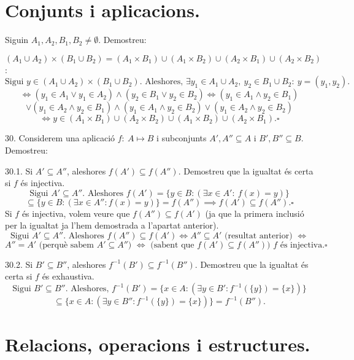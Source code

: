 \documentclass[11pt]{article}
\begin{document}
\section{Conjunts i aplicacions.}
\begin{legal}[start=21]
	\item Siguin $A_1,A_2,B_1,B_2\neq\emptyset$. Demostreu:
	\begin{legal}[start=3]
		\item $(A_1\cup A_2)\times (B_1\cup B_2)=(A_1\times B_1)\cup (A_1\times B_2)\cup (A_2\times B_1)\cup (A_2\times B_2)$:
		$$\textrm{Sigui }y\in (A_1\cup A_2)\times (B_1\cup B_2).\textrm{ Aleshores, }\exists y_1\in A_1\cup A_2, \ y_2\in B_1\cup B_2: \ y=(y_1,y_2).$$
		$$\iff (y_1\in A_1 \vee y_1\in A_2)\wedge (y_2\in B_1 \vee y_2\in B_2)\iff (y_1\in A_1\wedge y_2\in B_1)$$
		$$\vee (y_1\in A_2 \wedge y_2\in B_1)\wedge (y_1\in A_1\wedge y_2\in B_2)\vee (y_1\in A_2\wedge y_2\in B_2)$$
		$$\iff y\in (A_1\times B_1)\cup (A_2\times B_2)\cup (A_1\times B_2)\cup (A_2\times B_1).\square$$
	\end{legal}
	\item[30.] Considerem una aplicació $f: \ A\mapsto B$ i subconjunts $A',A''\subseteq A$ i $B',B''\subseteq B$. Demostreu:
	\begin{legal}
		\item[30.1.] Si $A'\subseteq A''$, aleshores $f(A')\subseteq f(A'')$. Demostreu que la igualtat és certa si $f$ és injectiva.
		$$\textrm{Sigui }A'\subseteq A''.\textrm{ Aleshores }f(A')=\{y\in B:(\exists x\in A':\ f(x)=y)\}$$
		$$\subseteq \{y\in B:(\exists x\in A'':f(x)=y)\}=f(A'')\implies f(A')\subseteq f(A'').\square$$
		Si $f$ és injectiva, volem veure que $f(A'')\subseteq f(A')$ (ja que la primera inclusió per la igualtat ja l'hem demostrada a l'apartat anterior).
		$$\textrm{Sigui }A'\subseteq A''.\textrm{ Aleshores }f(A'')\subseteq f(A') \iff A''\subseteq A'\textrm{ (resultat anterior) }\iff$$
		$$A''=A'\textrm{ (perquè sabem }A'\subseteq A''\textrm{) }\iff\textrm{ (sabent que }f(A')\subseteq f(A'')\textrm{) }f\textrm{ és injectiva.}\square$$
		\item[30.2.] Si $B'\subseteq B''$, aleshores $f^{-1}(B')\subseteq f^{-1}(B'')$. Demostreu que la igualtat és certa si $f$ és exhaustiva.
		$$\textrm{Sigui }B'\subseteq B''.\textrm{ Aleshores, }f^{-1}(B')=\{x\in A:(\exists y\in B':f^{-1}(\{y\})=\{x\})\}$$
		$$\subseteq\{x\in A:(\exists y\in B'':f^{-1}(\{y\})=\{x\})\}=f^{-1}(B'').$$
	\end{legal}
\end{legal}
\section{Relacions, operacions i estructures.}
\end{document}
